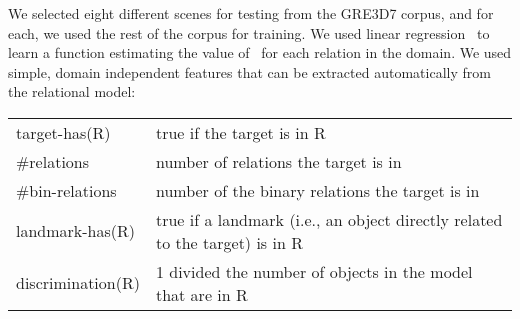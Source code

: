 We selected eight different scenes for testing from the GRE3D7 corpus, and for each, we used the rest of the corpus for training. We used linear regression~\cite{Hall:WEK09} to learn a function estimating the value of \puse\ for each relation in the domain.  We used simple, domain independent features that can be extracted automatically from the relational model:  
\vspace*{-.4cm}
\begin{small}
\begin{center}
\begin{tabular}{@{\ \ \ \ \ \ \ \ }l@{\ :=\ }p{10cm}} 
\small target-has(R)      & \small true if the target is in R \\
\small \#relations        & \small number of relations the target is in\\
\small \#bin-relations    & \small number of the binary relations the target is in \\
\small landmark-has(R)    & \small true if a landmark (i.e., an object directly related to the target) is in R\\
\small discrimination(R)  & \small 1 divided the number of objects in the model that are in R \\
\end{tabular}
\end{center}
\end{small}
\vspace*{-.4cm}


